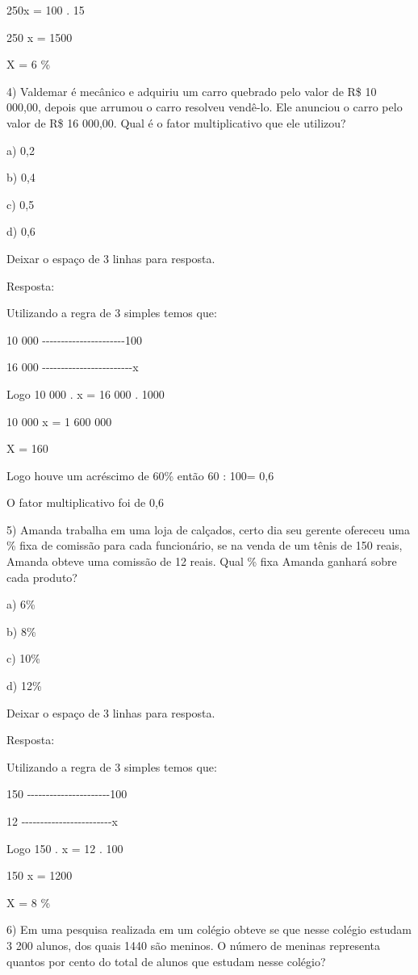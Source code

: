 250x = 100 . 15

250 x = 1500

X = 6 \%

4) Valdemar é mecânico e adquiriu um carro quebrado pelo valor de R\$ 10
000,00, depois que arrumou o carro resolveu vendê-lo. Ele anunciou o
carro pelo valor de R\$ 16 000,00. Qual é o fator multiplicativo que ele
utilizou?

a) 0,2

b) 0,4

c) 0,5

d) 0,6

Deixar o espaço de 3 linhas para resposta.

Resposta:

Utilizando a regra de 3 simples temos que:

10 000
-\/-\/-\/-\/-\/-\/-\/-\/-\/-\/-\/-\/-\/-\/-\/-\/-\/-\/-\/-\/-\/-100

16 000
-\/-\/-\/-\/-\/-\/-\/-\/-\/-\/-\/-\/-\/-\/-\/-\/-\/-\/-\/-\/-\/-\/-\/-x

Logo 10 000 . x = 16 000 . 1000

10 000 x = 1 600 000

X = 160

Logo houve um acréscimo de 60\% então 60 : 100= 0,6

O fator multiplicativo foi de 0,6

5) Amanda trabalha em uma loja de calçados, certo dia seu gerente
ofereceu uma \% fixa de comissão para cada funcionário, se na venda de
um tênis de 150 reais, Amanda obteve uma comissão de 12 reais. Qual \%
fixa Amanda ganhará sobre cada produto?

a) 6\%

b) 8\%

c) 10\%

d) 12\%

Deixar o espaço de 3 linhas para resposta.

Resposta:

Utilizando a regra de 3 simples temos que:

150 -\/-\/-\/-\/-\/-\/-\/-\/-\/-\/-\/-\/-\/-\/-\/-\/-\/-\/-\/-\/-\/-100

12
-\/-\/-\/-\/-\/-\/-\/-\/-\/-\/-\/-\/-\/-\/-\/-\/-\/-\/-\/-\/-\/-\/-\/-x

Logo 150 . x = 12 . 100

150 x = 1200

X = 8 \%

6) Em uma pesquisa realizada em um colégio obteve se que nesse colégio
estudam 3 200 alunos, dos quais 1440 são meninos. O número de meninas
representa quantos por cento do total de alunos que estudam nesse
colégio?

